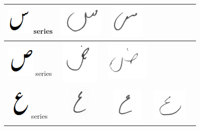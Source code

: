 \begin{table}[h]
\begin{tabular}{@{}ccccc@{}}
\hline
\includegraphics[scale=0.25]{seen_orig} series & \includegraphics[scale=0.15]{53} & \includegraphics[scale=0.15]{54}  & &  \\
\hline
\includegraphics[scale=0.20]{suad_orig} series & \includegraphics[scale=0.15]{55} & \includegraphics[scale=0.15]{56}  & & \\
\hline
\includegraphics[scale=0.15]{aien_orig} series & \includegraphics[scale=0.15]{57} & \includegraphics[scale=0.10]{58}  &
\includegraphics[scale=0.15]{59}  &  \\

\end{tabular}
\end{table}
